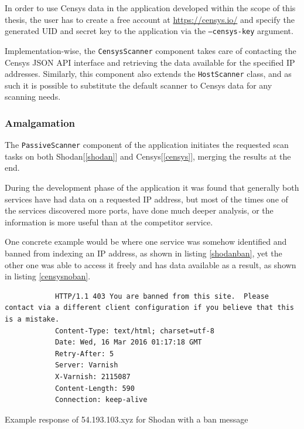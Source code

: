 \documentclass[a4paper,12pt]{article}
\begin{document}
	In order to use Censys data in the application developed within the scope of this thesis, the user has to create a free account at \url{https://censys.io/} and specify the generated UID and secret key to the application via the \texttt{--censys-key} argument.
		
	Implementation-wise, the \texttt{CensysScanner} component takes care of contacting the Censys JSON API interface and retrieving the data available for the specified IP addresses. Similarly, this component also extends the \texttt{HostScanner} class, and as such it is possible to substitute the default scanner to Censys data for any scanning needs.

\subsubsection{Amalgamation}
 

	The \texttt{PassiveScanner} component of the application initiates the requested scan tasks on both Shodan[\ref{shodan}] and Censys[\ref{censys}], merging the results at the end.
	
	During the development phase of the application it was found that generally both services have had data on a requested IP address, but most of the times one of the services discovered more ports, have done much deeper analysis, or the information is more useful than at the competitor service.
	
	One concrete example would be where one service was somehow identified and banned from indexing an IP address, as shown in listing \ref{shodanban}, yet the other one was able to access it freely and has data available as a result, as shown in listing \ref{censysnoban}.
	
	\begin{listing}[H]
		\begin{verbatim}
			HTTP/1.1 403 You are banned from this site.  Please contact via a different client configuration if you believe that this is a mistake.
			Content-Type: text/html; charset=utf-8
			Date: Wed, 16 Mar 2016 01:17:18 GMT
			Retry-After: 5
			Server: Varnish
			X-Varnish: 2115087
			Content-Length: 590
			Connection: keep-alive
		\end{verbatim}
		\caption{Example response of 54.193.103.xyz for Shodan with a ban message}
		\label{shodanban}
	\end{listing}
		
\end{document}
